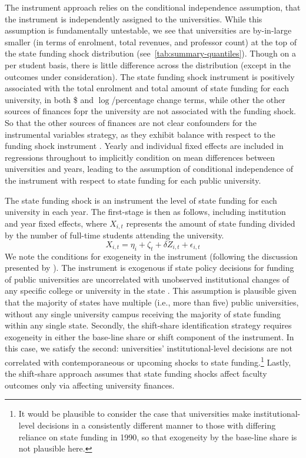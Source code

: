 The instrument approach relies on the conditional independence assumption, that the instrument is independently assigned to the universities.
While this assumption is fundamentally untestable, we see that universities are by-in-large smaller (in terms of enrolment, total revenues, and professor count) at the top of the state funding shock distribution (see~\autoref{tab:summary-quantiles}).
Though on a per student basis, there is little difference across the distribution (except in the outcomes under consideration).
The state funding shock instrument is positively associated with the total enrolment and total amount of state funding for each university, in both \$ and $\log$/percentage change terms, while other the other sources of finances fopr the university are not associated with the funding shock.
So that the other sources of finances are not clear confounders for the instrumental variables strategy, as they exhibit balance with respect to the funding shock instrument \citep{pei2019poorly}.
Yearly and individual fixed effects are included in regressions throughout to implicitly condition on mean differences between universities and years, leading to the assumption of conditional independence of the instrument with respect to state funding for each public university.

The state funding shock is an instrument the level of state funding for each university in each year.  
The first-stage is then as follows, including institution and year fixed effects, where $X_{i,t}$ represents the amount of state funding divided by the number of full-time students attending the university.
\begin{equation}
    \label{eqn:firststage}
    X_{i,t} = \eta_i + \zeta_t + \delta Z_{i,t} + \epsilon_{i,t}
\end{equation}
We note the conditions for exogeneity in the instrument (following the discussion presented by \citealt{NBERw27885}).
The instrument is exogenous if state policy decisions for funding of public universities are uncorrelated with unobserved institutional changes of any specific college or university in the state \citep{borusyak2022quasi}.
This assumption is plausible given that the majority of states have multiple (i.e., more than five) public universities, without any single university campus receiving the majority of state funding within any single state.
Secondly, the shift-share identification strategy requires exogeneity in either the base-line share or shift component of the instrument.
In this case, we satisfy the second: universities' institutional-level decisions are not correlated with contemporaneous or upcoming shocks to state funding.\footnote{
    It would be plausible to consider the case that universities make institutional-level decisions in a consistently different manner to those 
    with differing reliance on state funding in 1990, so that exogeneity by the base-line share is not plausible here.
}
Lastly, the shift-share approach assumes that state funding shocks affect faculty outcomes only via affecting university finances.

